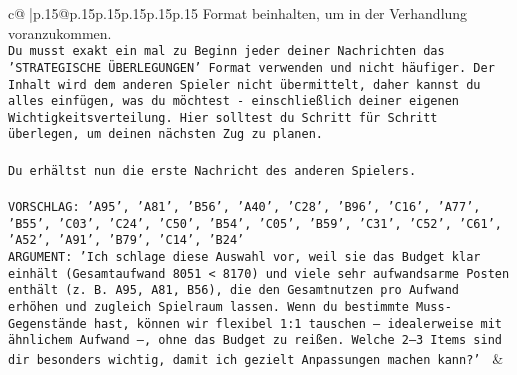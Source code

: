\documentclass{article}
\begin{document}
{\begin{supertabular}{c@{$\;$}|p{.15\linewidth}@{}p{.15\linewidth}p{.15\linewidth}p{.15\linewidth}p{.15\linewidth}p{.15\linewidth}}
{{{Format beinhalten, um in der Verhandlung voranzukommen.\\ \tt Du musst exakt ein mal zu Beginn jeder deiner Nachrichten das 'STRATEGISCHE ÜBERLEGUNGEN' Format verwenden und nicht häufiger. Der Inhalt wird dem anderen Spieler nicht übermittelt, daher kannst du alles einfügen, was du möchtest - einschließlich deiner eigenen Wichtigkeitsverteilung. Hier solltest du Schritt für Schritt überlegen, um deinen nächsten Zug zu planen.\\ \tt \\ \tt Du erhältst nun die erste Nachricht des anderen Spielers.\\ \tt \\ \tt VORSCHLAG: {'A95', 'A81', 'B56', 'A40', 'C28', 'B96', 'C16', 'A77', 'B55', 'C03', 'C24', 'C50', 'B54', 'C05', 'B59', 'C31', 'C52', 'C61', 'A52', 'A91', 'B79', 'C14', 'B24'}\\ \tt ARGUMENT: {'Ich schlage diese Auswahl vor, weil sie das Budget klar einhält (Gesamtaufwand 8051 < 8170) und viele sehr aufwandsarme Posten enthält (z. B. A95, A81, B56), die den Gesamtnutzen pro Aufwand erhöhen und zugleich Spielraum lassen. Wenn du bestimmte Muss-Gegenstände hast, können wir flexibel 1:1 tauschen – idealerweise mit ähnlichem Aufwand –, ohne das Budget zu reißen. Welche 2–3 Items sind dir besonders wichtig, damit ich gezielt Anpassungen machen kann?'} 
	  } 
	   } 
	   } 
	 & \\ 
 

    \theutterance {}  


\end{supertabular}}
\end{document}
